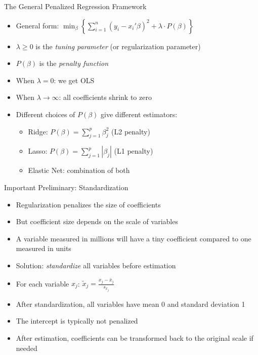 \documentclass[aspectratio=169]{beamer}
\begin{document}
\begin{frame}{The General Penalized Regression Framework}
\begin{itemize}
    \item General form: $\min_{\beta} \left\{ \sum_{i=1}^{n}(y_i - x_i'\beta)^2 + \lambda \cdot P(\beta) \right\}$
    \item $\lambda \geq 0$ is the \textit{tuning parameter} (or regularization parameter)
    \item $P(\beta)$ is the \textit{penalty function}
    \item When $\lambda = 0$: we get OLS
    \item When $\lambda \rightarrow \infty$: all coefficients shrink to zero
    \item Different choices of $P(\beta)$ give different estimators:
    \begin{itemize}
        \item Ridge: $P(\beta) = \sum_{j=1}^{p}\beta_j^2$ (L2 penalty)
        \item Lasso: $P(\beta) = \sum_{j=1}^{p}|\beta_j|$ (L1 penalty)
        \item Elastic Net: combination of both
    \end{itemize}
\end{itemize}
\end{frame}

\begin{frame}{Important Preliminary: Standardization}
\begin{itemize}
    \item Regularization penalizes the size of coefficients
    \item But coefficient size depends on the scale of variables
    \item A variable measured in millions will have a tiny coefficient compared to one measured in units
    \item Solution: \textit{standardize} all variables before estimation
    \item For each variable $x_j$: $\tilde{x}_j = \frac{x_j - \bar{x}_j}{s_{x_j}}$
    \item After standardization, all variables have mean 0 and standard deviation 1
    \item The intercept is typically not penalized
    \item After estimation, coefficients can be transformed back to the original scale if needed
\end{itemize}
\end{frame}
\end{document}
